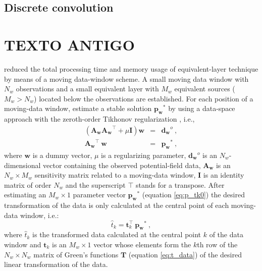 \cite{xia-sprowl1991}

\cite{xia-etal1993}

\cite{siqueira-etal2017}

\cite{jirigalatu-ebbing2019}


\subsection{Discrete convolution}

\cite{takahashi-etal2020}

\cite{takahashi-etal2022}

\section{TEXTO ANTIGO}

\cite{leao-silva1989} reduced the total processing time and memory usage
of equivalent-layer technique by means of a moving data-window scheme.
A small moving data window with $N_w$ observations and a small equivalent layer with $M_w$ equivalent sources 
($M_w > N_w$) located  below the observations are established.
For each position of a moving-data window, \cite{leao-silva1989} estimate a stable solution 
$\mathbf{{p_w}^{\ast}}$ by using a data-space approach with the zeroth-order Tikhonov regularization 
\citep{aster2018parameter}, i.e.,
\begin{subequations}
\begin{eqnarray}
\left( \mathbf{A_w} \mathbf{A_w}^{\top} + \mu \mathbf{I}\right) \mathbf{w} &=& \mathbf{d_w}^{o} \:, \\
\mathbf{A_w}^{\top} \: \mathbf{w} &=&  \mathbf{{p_w}^{\ast}} \:, 
\label{eq:p_tk0}
\end{eqnarray}
\end{subequations}
where $\mathbf{w}$ is a dummy vector, 
$\mu$ is a regularizing parameter, 
$\mathbf{d_w}^{o}$ is an $N_w$-dimensional vector containing the observed potential-field data, 
$\mathbf{A_w}$ is an $N_w \times M_w$  sensitivity matrix related to a moving-data window, 
$\mathbf{I}$ is  an identity matrix of order $N_w$ and 
the superscript $\top$ stands for a transpose. 
After estimating an $M_w \times 1$ parameter vector $\mathbf{{p_w}^{\ast}}$  (equation \ref{eq:p_tk0}) 
the desired transformation of the data is only calculated at the central point of each moving-data window, i.e.:
\begin{equation}
	\hat{t}_{k} = \mathbf{t}_k^{\top} \: \mathbf{{p_w}^{\ast}} \: ,
	\label{eq:t_leaosilva}
\end{equation}
where $\hat{t}_{k}$ is the transformed data calculated at the central point ${k}$ of the data window and
$\mathbf{t}_k$ is an $M_w \times 1$ vector whose elements form the $k$th row of the $N_w \times N_w$ 
matrix of Green's functions $\mathbf{T}$ (equation \ref{eq:t_data}) of 
the desired linear transformation of the data.

